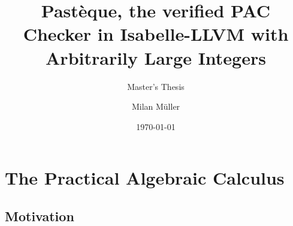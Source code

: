 \documentclass[aspectratio=169, 11pt]{beamer}
\title[Pastèque with Arbitrarily Large Integers]{Pastèque, the verified PAC Checker in Isabelle-LLVM with Arbitrarily Large Integers}
\subtitle{Master's Thesis}
\author{Milan Müller}
\institute[Uni Freiburg]{Albert-Ludwigs-Universität Freiburg}
\date{\today}
\begin{document}
\begin{frame}
  \titlepage
\end{frame}

\section{The Practical Algebraic Calculus}

\subsection{Motivation}

\end{document}
